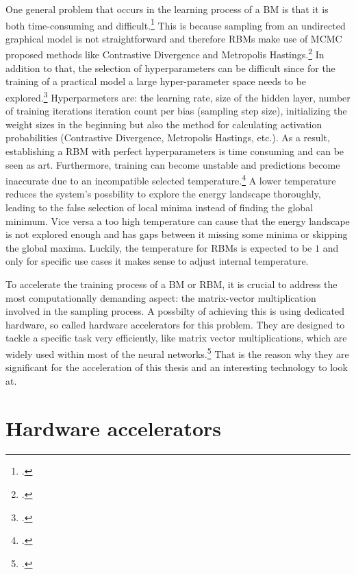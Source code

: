 One general problem that occurs in the learning process of a \ac{BM} is that it is both time-consuming and difficult.\footcite[cf.][1-2]{fischerIntroductionRestrictedBoltzmann2012}
This is because sampling from an undirected graphical model is not straightforward and therefore \ac{RBM}s make use
of \ac{MCMC} proposed methods like Contrastive Divergence and Metropolis Hastings.\footcite[cf.][2]{fischerIntroductionRestrictedBoltzmann2012}
In addition to that, the selection of hyperparameters can be difficult since for the training of a practical model a large hyper-parameter space needs to be explored.\footcite[cf.][536]{larochelleClassificationUsingDiscriminative2008}
Hyperparmeters are: the learning rate, size of the hidden layer, number of training iterations iteration count per bias (sampling step size), initializing the weight sizes in the beginning but also the method for calculating activation probabilities (Contrastive Divergence, Metropolis Hastings, etc.).
As a result, establishing a \ac{RBM} with perfect hyperparameters is time consuming and can be seen as art.
Furthermore, training can become unstable and predictions become inaccurate due to an incompatible selected temperature.\footcite[cf.][3-4]{huembeliPhysicsEnergybasedModels2022}
A lower temperature reduces the system's possbility to explore the energy landscape thoroughly, leading to the false selection of local minima instead of finding the global minimum.
Vice versa a too high temperature can cause that the energy landscape is not explored enough and has gaps between it missing some minima or skipping the global maxima. 
Luckily, the temperature for \ac{RBM}s is expected to be \( 1 \) and only for specific use cases it makes sense to adjust internal temperature.

To accelerate the training process of a \ac{BM} or \ac{RBM}, it is crucial to address the most computationally demanding aspect: the matrix-vector multiplication involved in the sampling process.
A possbilty of achieving this is using dedicated hardware, so called hardware accelerators for this problem. 
They are designed to tackle a specific task very efficiently, like matrix vector multiplications, which are widely used within most of the neural networks.\footcite[cf.][3881-3882]{lehnertMostResourceEfficient2023}
That is the reason why they are significant for the acceleration of this thesis and an interesting technology to look at.  


\section{Hardware accelerators}
